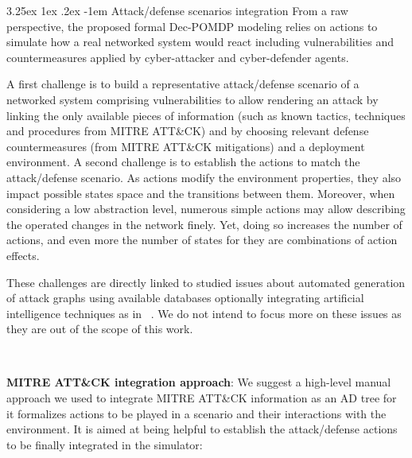 \documentclass[conference]{IEEEtran}
\makeatletter
\renewcommand\paragraph{\@startsection{paragraph}{5}{\z@}%
  {3.25ex \@plus1ex \@minus.2ex}%
  {-1em}%
  {\normalfont\normalsize\bfseries}}
\makeatother
\begin{document}
\paragraph{Attack/defense scenarios integration}
From a raw perspective, the proposed formal Dec-POMDP modeling relies on actions to simulate how a real networked system would react including vulnerabilities and countermeasures applied by cyber-attacker and cyber-defender agents.

A first challenge is to build a representative attack/defense scenario of a networked system comprising vulnerabilities to allow rendering an attack by linking the only available pieces of information (such as known tactics, techniques and procedures from MITRE ATT\&CK) and by choosing relevant defense countermeasures (from MITRE ATT\&CK mitigations) and a deployment environment. A second challenge is to establish the actions to match the attack/defense scenario. As actions modify the environment properties, they also impact possible states space and the transitions between them.
Moreover, when considering a low abstraction level, numerous simple actions may allow describing the operated changes in the network finely. Yet, doing so increases the number of actions, and even more the number of states for they are combinations of action effects.

These challenges are directly linked to studied issues about automated generation of attack graphs using available databases optionally integrating artificial intelligence techniques as in ~\cite{GFalco2018}. We do not intend to focus more on these issues as they are out of the scope of this work.

\

\noindent
\textbf{MITRE ATT\&CK integration approach}: We suggest a high-level manual approach we used to integrate MITRE ATT\&CK information as an AD tree for it formalizes actions to be played in a scenario and their interactions with the environment. It is aimed at being helpful to establish the attack/defense actions to be finally integrated in the simulator:
\end{document}
